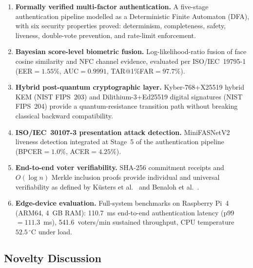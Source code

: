 \documentclass[pdflatex,sn-mathphys-num]{sn-jnl}%
\theoremstyle{thmstyleone}%
\theoremstyle{thmstyletwo}%
\theoremstyle{thmstylethree}%
\begin{document}
\begin{enumerate}[label=\textbf{C\arabic*.}]
  \item \textbf{Formally verified multi-factor authentication.}
        A five-stage authentication pipeline modelled as a Deterministic Finite
        Automaton (DFA), with six security properties proved: determinism,
        completeness, safety, liveness, double-vote prevention, and rate-limit
        enforcement.

  \item \textbf{Bayesian score-level biometric fusion.}
        Log-likelihood-ratio fusion of face cosine similarity and NFC channel
        evidence, evaluated per ISO/IEC~19795-1 (EER$=1.55\%$, AUC$=0.9991$,
        TAR@1\%FAR$=97.7\%$).

  \item \textbf{Hybrid post-quantum cryptographic layer.}
        Kyber-768$+$X25519 hybrid KEM (NIST FIPS~203) and
        Dilithium-3$+$Ed25519 digital signatures (NIST FIPS~204) provide a
        quantum-resistance transition path without breaking classical backward
        compatibility.

  \item \textbf{ISO/IEC~30107-3 presentation attack detection.}
        MiniFASNetV2 liveness detection integrated at Stage~5 of the
        authentication pipeline (BPCER$=1.0\%$, ACER$=4.25\%$).

  \item \textbf{End-to-end voter verifiability.}
        SHA-256 commitment receipts and $O(\log n)$ Merkle inclusion proofs
        provide individual and universal verifiability as defined by
        K\"{u}sters et al.~\cite{kusters2010accountability} and Benaloh et
        al.~\cite{benaloh2011e2e}.

  \item \textbf{Edge-device evaluation.}
        Full-system benchmarks on Raspberry Pi~4 (ARM64, 4~GB RAM):
        110.7~ms end-to-end authentication latency (p99$=111.3$~ms),
        541.6~voters/min sustained throughput, CPU temperature~$52.5\,^\circ$C
        under load.
\end{enumerate}

\subsection{Novelty Discussion}
\end{document}
